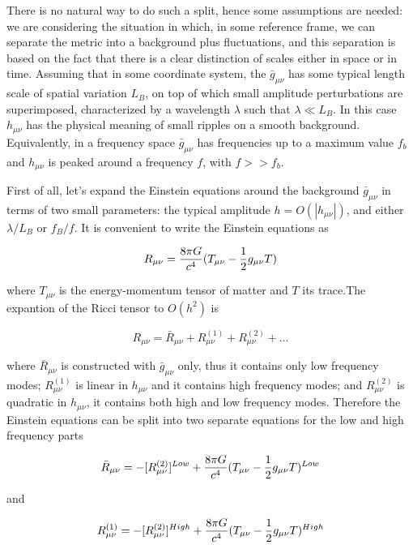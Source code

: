 \documentclass[binding=0.6cm, LaM]{sapthesis}
\begin{document}
	There is no natural way to do such a split, hence some assumptions are needed: we are considering the situation in which, 
	in some reference frame, we can separate the metric into a background plus fluctuations, 
	and this separation is based on the fact that there is a clear distinction of scales either in space or in time.
	Assuming that in some coordinate system, the $\bar g_{\mu \nu}$ has some typical length scale of spatial variation $L_B$, 
	on top of which small amplitude perturbations are superimposed, characterized by a wavelength $\lambda$ such that $\lambda \ll L_B$. 
	In this case $h_{\mu\nu}$ has the physical meaning of small ripples on a smooth background.
	Equivalently, in a frequency space $\bar g_{\mu\nu}$ has frequencies up to a maximum value $f_b$ and  $h_{\mu\nu}$  
	is peaked around a frequency $f$, with $f >> f_b$.

	First of all, let's expand the Einstein equations around the background $\bar g_{\mu \nu}$ in terms of two small parameters: 
	the typical amplitude $h= O(|h_{\mu\nu}|)$, and either $\lambda/L_B$ or $f_B/f$.
	It is convenient to write the Einstein equations as

		\begin{equation}
		R_{\mu\nu} = {{8\pi G}\over c^4}(T_{\mu\nu}- {1 \over 2}g_{\mu\nu}T) 
		\end{equation}

	where $T_{\mu\nu}$ is the energy-momentum tensor of matter and $T$ its trace.The expantion of the Ricci tensor to $O(h^2)$ is

		\begin{equation}
		R_{\mu\nu} = {\bar R_{\mu\nu}} + R_{\mu\nu}^{(1)} + R_{\mu\nu}^{(2)} + ...
		\end{equation}

	where $ {\bar R_{\mu\nu}}$ is constructed with $\bar g_{\mu\nu}$ only, thus it contains only low frequency modes;
	$R_{\mu\nu}^{(1)}$ is linear in $h_{\mu\nu}$ and it contains high frequency modes;
	and $R_{\mu\nu}^{(2)} $ is quadratic in $h_{\mu\nu}$, it contains both high and low frequency modes.
	Therefore the Einstein equations can be split into two separate equations for the low and high frequency parts

		\begin{equation}
		{\bar R_{\mu\nu}} = -[R_{\mu\nu}^{(2)}]^{Low} + {{8\pi G}\over c^4}(T_{\mu\nu}- {1 \over 2}g_{\mu\nu}T) ^{Low}
		\end{equation}

	and

		\begin{equation}
 		R_{\mu\nu}^{(1)} = - [R_{\mu\nu}^{(2)}]^{High} +  {{8\pi G}\over c^4}(T_{\mu\nu}- {1 \over 2}g_{\mu\nu}T)^{High}
		\end{equation}
\end{document}
